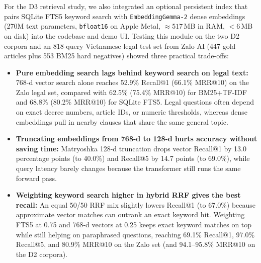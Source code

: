  For the D3 retrieval study, we also integrated an optional persistent index that pairs SQLite FTS5 keyword search with \texttt{EmbeddingGemma-2} dense embeddings (270M text parameters, \texttt{bfloat16} on Apple Metal, ${\approx}517$\,MB in RAM, $<6$\,MB on disk) into the codebase and demo UI. Testing this module on the two D2 corpora and an 818-query Vietnamese legal test set from Zalo AI (447 gold articles plus 553 BM25 hard negatives) showed three practical trade-offs:
\begin{itemize}
\item \textbf{Pure embedding search lags behind keyword search on legal text:} 768-d vector search alone reaches 52.9\% Recall@1 (66.1\% MRR@10) on the Zalo legal set, compared with 62.5\% (75.4\% MRR@10) for BM25+TF-IDF and 68.8\% (80.2\% MRR@10) for SQLite FTS5. Legal questions often depend on exact decree numbers, article IDs, or numeric thresholds, whereas dense embeddings pull in nearby clauses that share the same general topic.
\item \textbf{Truncating embeddings from 768-d to 128-d hurts accuracy without saving time:} Matryoshka 128-d truncation drops vector Recall@1 by 13.0 percentage points (to 40.0\%) and Recall@5 by 14.7 points (to 69.0\%), while query latency barely changes because the transformer still runs the same forward pass.
\item \textbf{Weighting keyword search higher in hybrid RRF gives the best recall:} An equal 50/50 RRF mix slightly lowers Recall@1 (to 67.0\%) because approximate vector matches can outrank an exact keyword hit. Weighting FTS5 at 0.75 and 768-d vectors at 0.25 keeps exact keyword matches on top while still helping on paraphrased questions, reaching 69.1\% Recall@1, 97.0\% Recall@5, and 80.9\% MRR@10 on the Zalo set (and 94.1--95.8\% MRR@10 on the D2 corpora).
\end{itemize}
